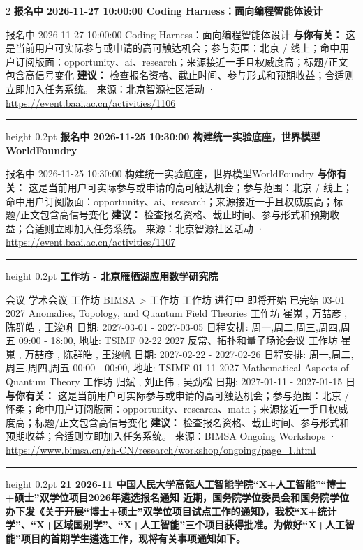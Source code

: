 \documentclass[10.5pt]{ctexart}
\begin{document}
\begin{multicols}{2}
{\large\bfseries 报名中 2026-11-27 10:00:00 Coding Harness：面向编程智能体设计}\par
报名中 2026-11-27 10:00:00 Coding Harness：面向编程智能体设计
\textbf{与你有关：} 这是当前用户可实际参与或申请的高可触达机会；参与范围：北京 / 线上；命中用户订阅版面：opportunity、ai、research；来源接近一手且权威度高；标题/正文包含高信号变化
\textbf{建议：} 检查报名资格、截止时间、参与形式和预期收益；合适则立即加入任务系统。
{\footnotesize\color{ormuted} 来源：北京智源社区活动 · \url{https://event.baai.ac.cn/activities/1106}}
\vspace{2mm}
\hrule height 0.2pt
\vspace{2mm}
{\large\bfseries 报名中 2026-11-25 10:30:00 构建统一实验底座，世界模型WorldFoundry}\par
报名中 2026-11-25 10:30:00 构建统一实验底座，世界模型WorldFoundry
\textbf{与你有关：} 这是当前用户可实际参与或申请的高可触达机会；参与范围：北京 / 线上；命中用户订阅版面：opportunity、ai、research；来源接近一手且权威度高；标题/正文包含高信号变化
\textbf{建议：} 检查报名资格、截止时间、参与形式和预期收益；合适则立即加入任务系统。
{\footnotesize\color{ormuted} 来源：北京智源社区活动 · \url{https://event.baai.ac.cn/activities/1107}}
\vspace{2mm}
\hrule height 0.2pt
\vspace{2mm}
{\large\bfseries 工作坊 - 北京雁栖湖应用数学研究院}\par
会议 学术会议 工作坊 BIMSA > 工作坊 工作坊 进行中 即将开始 已完结 03-01 2027 Anomalies, Topology, and Quantum Field Theories 工作坊 崔嵬 , 万喆彦 , 陈群皓 , 王浚帆 日期: 2027-03-01 - 2027-03-05 日程安排: 周一,周二,周三,周四,周五 09:00 - 18:00, 地址: TSIMF 02-22 2027 反常、拓扑和量子场论会议 工作坊 崔嵬 , 万喆彦 , 陈群皓 , 王浚帆 日期: 2027-02-22 - 2027-02-26 日程安排: 周一,周二,周三,周四,周五 00:00 - 00:00, 地址: TSIMF 01-11 2027 Mathematical Aspects of Quantum Theory 工作坊 归斌 , 刘正伟 , 吴劲松 日期: 2027-01-11 - 2027-01-15 日
\textbf{与你有关：} 这是当前用户可实际参与或申请的高可触达机会；参与范围：北京 / 怀柔；命中用户订阅版面：opportunity、research、math；来源接近一手且权威度高；标题/正文包含高信号变化
\textbf{建议：} 检查报名资格、截止时间、参与形式和预期收益；合适则立即加入任务系统。
{\footnotesize\color{ormuted} 来源：BIMSA Ongoing Workshops · \url{https://www.bimsa.cn/zh-CN/research/workshop/ongoing/page_1.html}}
\vspace{2mm}
\hrule height 0.2pt
\vspace{2mm}
{\large\bfseries 21 2026-11 中国人民大学高瓴人工智能学院“X+人工智能”“博士+硕士”双学位项目2026年遴选报名通知 近期，国务院学位委员会和国务院学位办下发《关于开展“博士+硕士”双学位项目试点工作的通知》，我校“X+统计学”、“X+区域国别学”、“X+人工智能”三个项目获得批准。为做好“X+人工智能”项目的首期学生遴选工作，现将有关事项通知如下。}\par

\end{multicols}
\end{document}
